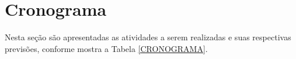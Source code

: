 \documentclass[../main.tex]{subfiles}
\begin{document}
\chapter{Cronograma}
Nesta seção são apresentadas as atividades a serem realizadas e suas respectivas previsões, conforme mostra a Tabela \ref{CRONOGRAMA}.
\end{document}
